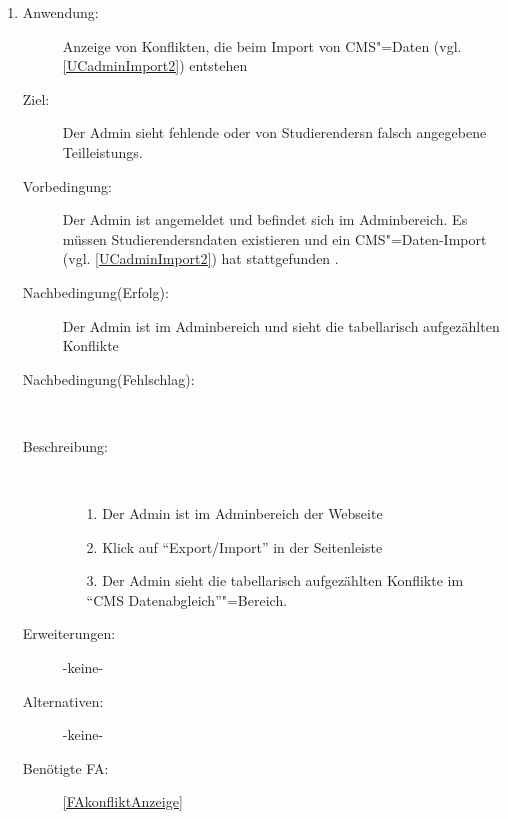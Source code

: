 \documentclass[parskip=full]{scrartcl}
\newcommand{\swtLabel}[1]{\textbf{/#1\arabic*0/}}
\begin{document}
\begin{enumerate} [label=\swtLabel{A}]
    \item \label{UCadminKonfliktAnzeige}
    \begin{description}
    \item[Anwendung:] Anzeige von Konflikten, die beim Import von \gls{CMS}"=Daten (vgl. \ref{UCadminImport2}) entstehen
    \item[Ziel:] Der \gls{Admin} sieht fehlende oder von \glspl{Studierender}n falsch angegebene \glspl{Teilleistung}.
    \item[Vorbedingung:] Der \gls{Admin} ist angemeldet und befindet sich im
    \gls{Admin}bereich. Es müssen \glspl{Studierender}ndaten existieren und ein \gls{CMS}"=Daten-Import (vgl. \ref{UCadminImport2}) hat stattgefunden .
    \item[Nachbedingung(Erfolg):] Der \gls{Admin} ist im \gls{Admin}bereich und sieht die tabellarisch aufgezählten Konflikte
    \item[Nachbedingung(Fehlschlag):] ~
    \item[Beschreibung:]~
    \begin{enumerate}
      \item[1.] Der \gls{Admin} ist im \gls{Admin}bereich der Webseite
      \item[2.] Klick auf \enquote{Export/Import}
      in der Seitenleiste
       \item[3.] Der \gls{Admin} sieht die tabellarisch aufgezählten Konflikte im \enquote{CMS Datenabgleich}"=Bereich.
    \end{enumerate}
    \item[Erweiterungen:] -keine-
    \item[Alternativen:] -keine-
    \item[Benötigte FA:] \ref{FAkonfliktAnzeige}
  \end{description}
  

\end{enumerate}
\end{document}
